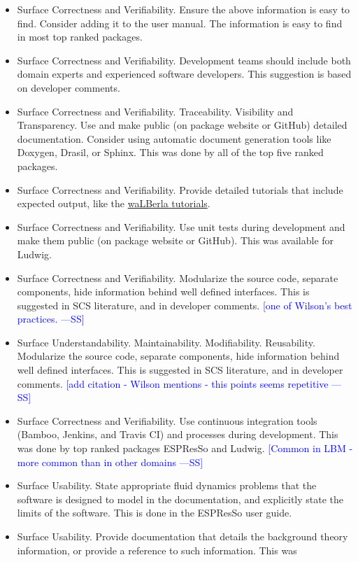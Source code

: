 \documentclass[final, 3p, times, authoryear]{elsarticle}
\newcommand{\authornote}[3]{\textcolor{#1}{[#3 ---#2]}}
\newcommand{\authornote}[3]{}
\newcommand{\wss}[1]{\authornote{blue}{SS}{#1}} %
\begin{document}
\begin{itemize}
	\item Surface Correctness and Verifiability. Ensure the above information is
	easy to find. Consider adding it to the user manual. The information is easy
	to find in most top ranked packages.
	\item Surface Correctness and Verifiability. Development teams should
	include both domain experts and experienced software developers. This
	suggestion is based on developer comments.
	\item Surface Correctness and Verifiability. Traceability. Visibility and
	Transparency. Use and make public (on package website or GitHub) detailed
	documentation. Consider using automatic document generation tools like
	Doxygen, Drasil, or Sphinx. This was done by all of the top five ranked
	packages.
	\item Surface Correctness and Verifiability. Provide detailed tutorials that
	include expected output, like the
	\href{https://www.walberla.net/doxygen/index.html}{waLBerla tutorials}.
	\item Surface Correctness and Verifiability. Use unit tests during
	development and make them public (on package website or GitHub). This was
	available for Ludwig.
	\item Surface Correctness and Verifiability. Modularize the source code,
	separate components, hide information behind well defined interfaces. This
	is suggested in SCS literature, and in developer comments.  \wss{one of
	Wilson's best practices.}
	\item Surface Understandability. Maintainability.  Modifiability.
	Reusability. Modularize the source code, separate components, hide
	information behind well defined interfaces. This is suggested in SCS
	literature, and in developer comments. \wss{add citation - Wilson mentions -
	this points seems repetitive}
	\item Surface Correctness and Verifiability. Use continuous integration
	tools (Bamboo, Jenkins, and Travis CI) and processes during development.
	This was done by top ranked packages ESPResSo and Ludwig.  \wss{Common in
	LBM - more common than in other domains}
	\item Surface Usability. State appropriate fluid dynamics problems that the
	software is designed to model in the documentation, and explicitly state the
	limits of the software. This is done in the ESPResSo user guide.
	\item Surface Usability. Provide documentation that details the background
	theory information, or provide a reference to such information. This was

\end{itemize}
\end{document}
